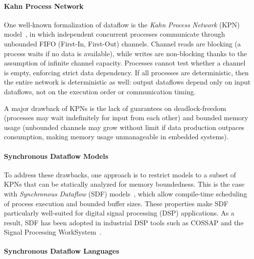 \paragraph{Kahn Process Network}
\label{sec:intro:dsl:dataflow:kpn}

One well-known formalization of dataflow is the \emph{Kahn Process Network} (KPN)
model~\cite{DBLP:conf/ifip/Kahn74}, in which independent concurrent processes communicate through
unbounded FIFO (First-In, First-Out) channels. Channel reads are blocking (a process waits if no
data is available), while writes are non-blocking thanks to the assumption of infinite channel
capacity. Processes cannot test whether a channel is empty, enforcing strict data dependency. If all
processes are deterministic, then the entire network is deterministic as well: output dataflows
depend only on input dataflows, not on the execution order or communication timing.

A major drawback of KPNs is the lack of guarantees on deadlock-freedom (processes may wait
indefinitely for input from each other) and bounded memory usage (unbounded channels may grow
without limit if data production outpaces consumption, making memory usage unmanageable in embedded
systems).

\paragraph{Synchronous Dataflow Models}
\label{sec:intro:dsl:dataflow:sdf}

To address these drawbacks, one approach is to restrict models to a subset of KPNs that can be
statically analyzed for memory boundedness. This is the case with \emph{Synchronous Dataflow} (SDF)
models~\cite{DBLP:journals/tc/LeeM87}, which allow compile-time scheduling of process execution and
bounded buffer sizes. These properties make SDF particularly well-suited for digital signal
processing (DSP) applications. As a result, SDF has been adopted in industrial DSP tools such as
COSSAP and the Signal Processing WorkSystem~\cite{books/kap/BattacharyyaLM96}.

\paragraph{Synchronous Dataflow Languages}
\label{sec:intro:dsl:dataflow:synchronous_languages}

